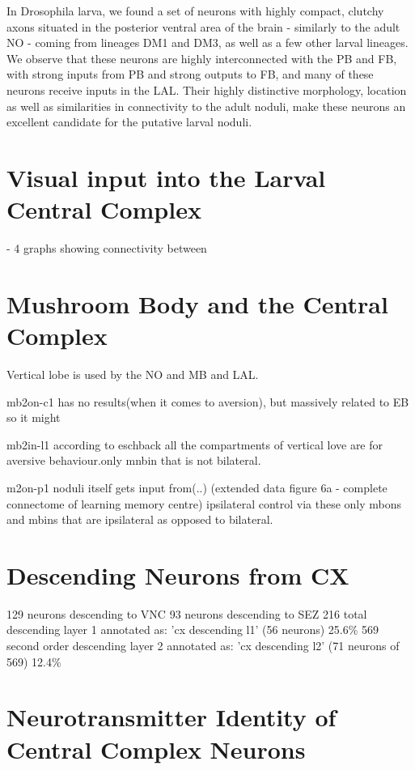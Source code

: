     In Drosophila larva, we found a set of neurons with highly compact, clutchy axons situated in the posterior ventral area of the brain - similarly to the adult NO - coming from lineages DM1 and DM3, as well as a few other larval lineages. We observe that these neurons are highly interconnected with the PB and FB,  with strong inputs from 
    PB and strong outputs to FB, and many of these neurons receive inputs in the LAL.
    Their highly distinctive morphology, location as well as similarities in connectivity to the adult noduli, make these neurons an excellent candidate for the putative larval noduli.


\section{Visual input into the Larval Central Complex}
        - 4 graphs showing connectivity between
        
    
\section{Mushroom Body and the Central Complex}
Vertical lobe is used by the NO and MB and LAL.

mb2on-c1 has no results(when it comes to aversion), but massively related to EB so it might 

mb2in-l1 according to eschback all the compartments of vertical love are for aversive behaviour.only mnbin that is not bilateral.  

m2on-p1 noduli itself gets input from(..) 
 (extended data figure 6a - complete connectome of learning memory centre) 
 ipsilateral control via these only mbons and mbins that are ipsilateral as opposed to bilateral. 


\section{Descending Neurons from CX}
            129 neurons descending to VNC
            93 neurons descending to SEZ
            216 total descending
            layer 1 annotated as: 'cx descending l1' (56 neurons) 25.6\%
            569 second order descending
            layer 2 annotated as: 'cx descending l2' (71 neurons of 569) 12.4\%


\section{Neurotransmitter Identity of Central Complex Neurons}
